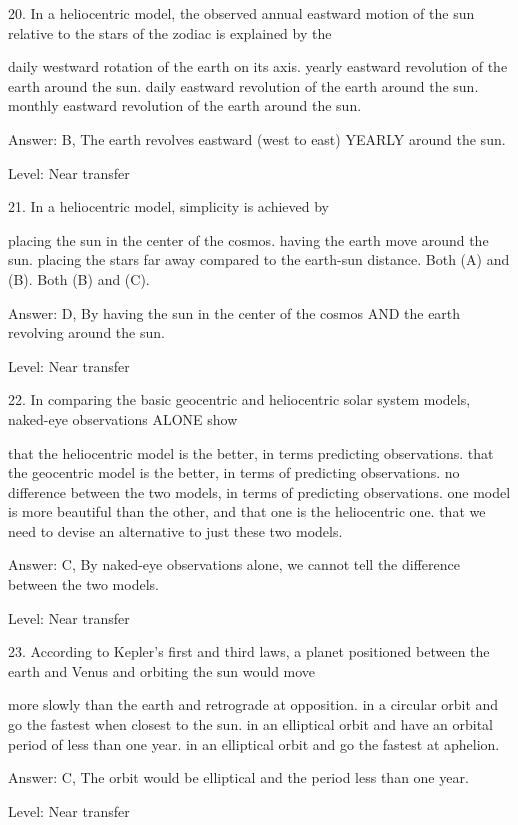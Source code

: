 20. In a heliocentric model, the observed annual eastward motion of the sun relative to the stars of the zodiac is explained by the

    daily westward rotation of the earth on its axis.
    yearly eastward revolution of the earth around the sun.
    daily eastward revolution of the earth around the sun.
    monthly eastward revolution of the earth around the sun. 

Answer: B, The earth revolves eastward (west to east) YEARLY around the sun.

Level: Near transfer

21. In a heliocentric model, simplicity is achieved by

    placing the sun in the center of the cosmos.
    having the earth move around the sun.
    placing the stars far away compared to the earth-sun distance.
    Both (A) and (B).
    Both (B) and (C). 

Answer: D, By having the sun in the center of the cosmos AND the earth revolving around the sun.

Level: Near transfer

22. In comparing the basic geocentric and heliocentric solar system models, naked-eye observations ALONE show

    that the heliocentric model is the better, in terms predicting observations.
    that the geocentric model is the better, in terms of predicting observations.
    no difference between the two models, in terms of predicting observations.
    one model is more beautiful than the other, and that one is the heliocentric one.
    that we need to devise an alternative to just these two models. 

Answer: C, By naked-eye observations alone, we cannot tell the difference between the two models.

Level: Near transfer

23. According to Kepler's first and third laws, a planet positioned between the earth and Venus and orbiting the sun would move

    more slowly than the earth and retrograde at opposition.
    in a circular orbit and go the fastest when closest to the sun.
    in an elliptical orbit and have an orbital period of less than one year.
    in an elliptical orbit and go the fastest at aphelion. 

Answer: C, The orbit would be elliptical and the period less than one year.

Level: Near transfer

